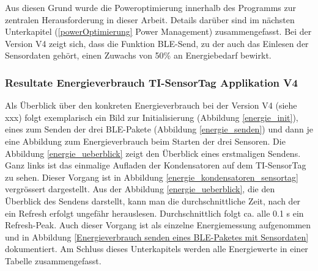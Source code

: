 Aus diesen Grund wurde die Poweroptimierung innerhalb des Programms zur zentralen Herausforderung in dieser Arbeit. Details darüber sind im nächsten Unterkapitel (\ref{powerOptimierung} Power Management) zusammengefasst. Bei der Version V4 zeigt sich, dass die Funktion BLE-Send, zu der auch das Einlesen der Sensordaten gehört, einen Zuwachs von 50\thinspace\% an Energiebedarf bewirkt. 



\subsubsection{Resultate Energieverbrauch TI-SensorTag Applikation V4}
\label{energie_sensortag} 

Als Überblick über den konkreten Energieverbrauch bei der Version V4 (siehe  xxx) folgt exemplarisch ein Bild zur Initialisierung (Abbildung \ref{energie_init}), eines zum Senden der drei BLE-Pakete (Abbildung \ref{energie_senden}) und dann je eine Abbildung zum Energieverbrauch beim Starten der drei Sensoren. Die Abbildung \ref{energie_ueberblick} zeigt den Überblick eines erstmaligen Sendens. Ganz links ist das einmalige Aufladen der Kondensatoren auf dem TI-SensorTag zu sehen. Dieser Vorgang ist in Abbildung \ref{energie_kondensatoren_sensortag} vergrössert dargestellt. Aus der Abbildung \ref{energie_ueberblick}, die den Überblick des Sendens darstellt, kann man die durchschnittliche Zeit, nach der ein Refresh erfolgt ungefähr herauslesen. Durchschnittlich folgt ca. alle 0.1 s ein Refresh-Peak. Auch dieser Vorgang ist als einzelne Energiemessung aufgenommen und in Abbildung \ref{Energieverbrauch senden eines BLE-Paketes mit Sensordaten} dokumentiert. Am Schluss dieses Unterkapitels werden alle Energiewerte in einer Tabelle zusammengefasst.

\clearpage

